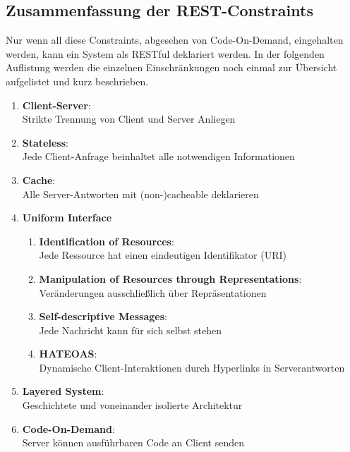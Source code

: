 \documentclass[draft,final]{vutinfth} %
\begin{document}
\subsection{Zusammenfassung der REST-Constraints}

Nur wenn all diese Constraints, abgesehen von Code-On-Demand, eingehalten werden, kann ein System als RESTful deklariert werden. 
In der folgenden Auflistung werden die einzelnen Einschränkungen noch einmal zur Übersicht aufgelistet und kurz beschrieben.

\begin{enumerate}
	\item \textbf{Client-Server}:   \\  Strikte Trennung von Client und Server Anliegen
	\item \textbf{Stateless}:       \\  Jede Client-Anfrage beinhaltet alle notwendigen Informationen
	\item \textbf{Cache}:           \\  Alle Server-Antworten mit (non-)cacheable deklarieren
	
	\item \textbf{Uniform Interface} 
	\begin{enumerate}[label*=\arabic*.]
		\item \textbf{Identification of Resources}: 					  \\ Jede Ressource hat einen eindeutigen Identifikator (URI)
		\item \textbf{Manipulation of Resources through Representations}: \\ Veränderungen ausschließlich über Repräsentationen
		\item \textbf{Self-descriptive Messages}: 						  \\ Jede Nachricht kann für sich selbst stehen
		\item \textbf{HATEOAS}: 										  \\ Dynamische Client-Interaktionen durch Hyperlinks in Serverantworten
	\end{enumerate}
		
	\item \textbf{Layered System}:  \\ Geschichtete und voneinander isolierte Architektur
	\item \textbf{Code-On-Demand}:  \\ Server können ausführbaren Code an Client senden
\end{enumerate}
\end{document}
